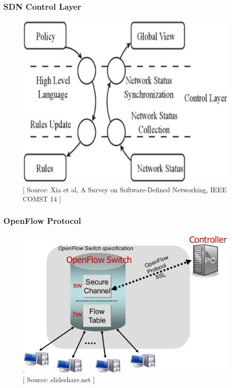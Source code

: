 \documentclass{beamer}
\begin{document}
\begin{frame}
  \frametitle{SDN Control Layer}
  \begin{figure}
    \begin{center}
      \includegraphics[scale=0.25]{images/sdn-13}
    \end{center}
    \vspace{0.5cm}
    \caption{\small{[ Source: Xia et al, A Survey on Software-Defined Networking, IEEE COMST 14 ]}}
  \end{figure}
\end{frame}
\begin{frame}
  \frametitle{OpenFlow Protocol}
  \begin{figure}
    \begin{center}
      \includegraphics[scale=0.25]{images/sdn-14}
    \end{center}
    \caption{\small{[ Source: slideshare.net ]}}
  \end{figure}
\end{frame}
\end{document}
